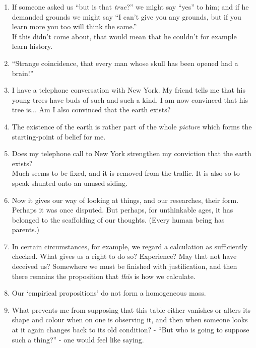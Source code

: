 \documentclass{book}
\begin{document}
\begin{enumerate}
\item
If someone asked us ``but is that \emph{true}?'' we might say ``yes'' to him;
and if he demanded grounds we might say ``I can't give you any grounds, but if
you learn more you too will think the same.'' \\
If this didn't come about, that would mean that he couldn't for example learn
history.

\item
``Strange coincidence, that every man whose skull has been opened had a
brain!''

\item
I have a telephone conversation with New York. My friend tells me that his
young trees have buds of such and such a kind. I am now convinced that his tree
is... Am I also convinced that the earth exists?

\item
The existence of the earth is rather part of the whole \emph{picture} which
forms the starting-point of belief for me.

\item
Does my telephone call to New York strengthen my conviction that the earth
exists? \\
Much seems to be fixed, and it is removed from the traffic. It is also so to
speak shunted onto an unused siding.

\item
Now it gives our way of looking at things, and our researches, their form.
Perhaps it was once disputed. But perhaps, for unthinkable ages, it has
belonged to the scaffolding of our thoughts. (Every human being has parents.)

\item
In certain circumstances, for example, we regard a calculation as sufficiently
checked. What gives us a right to do so? Experience? May that not have deceived
us? Somewhere we must be finished with justification, and then there remains
the proposition that \emph{this} is how we calculate.

\item
Our `empirical propositions' do not form a homogeneous mass.

\item
What prevents me from supposing that this table either vanishes or alters its
shape and colour when on one is observing it, and then when someone looks at it
again changes back to its old condition? - ``But who is going to suppose such a
thing?'' - one would feel like saying.


\end{enumerate}
\end{document}
